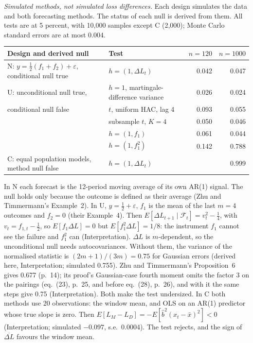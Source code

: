 \begin{qfmethod}
\emph{Simulated methods, not simulated loss differences.} Each design simulates the data and both forecasting methods. The status of each null is derived from them. All tests are at 5 percent, with 10,000 samples except C (2,000); Monte Carlo standard errors are at most 0.004.
\begin{center}\small
\begin{tabular}{@{}llrr@{}}
\toprule
Design and derived null & Test & $n=120$ & $n=1000$ \\
\midrule
N: $y=\tfrac12(f_1+f_2)+\varepsilon$, conditional null true & $h=(1,\Delta L_t)$ & 0.042 & 0.047 \\
U: unconditional null true, & $h=1$, martingale-difference variance & 0.026 & 0.024 \\
\quad conditional null false & $t$, uniform HAC, lag 4 & 0.093 & 0.055 \\
 & subsample $t$, $K=4$ & 0.050 & 0.046 \\
 & $h=(1,f_1)$ & 0.061 & 0.044 \\
 & $h=(1,f_1^2)$ & 0.142 & 0.788 \\
C: equal population models, method null false & $h=(1,\Delta L_t)$ & & 0.999 \\
\bottomrule
\end{tabular}
\end{center}
In N each forecast is the 12-period moving average of its own AR(1) signal. The null holds only because the outcome is defined as their average (Zhu and Timmermann's Example~2). In U, $y=\tfrac12+\varepsilon$, $f_1$ is the mean of the last $m=4$ outcomes and $f_2=0$ (their Example~4). Then $E[\Delta L_{t+1}\mid\mathcal F_t]=v_t^2-\tfrac14$, with $v_t=f_{1,t}-\tfrac12$, so $E[f_1\Delta L]=0$ but $E[f_1^2\Delta L]=1/8$: the instrument $f_1$ cannot see the failure and $f_1^2$ can (Interpretation). $\Delta L$ is $m$-dependent, so the unconditional null needs autocovariances. Without them, the variance of the normalised statistic is $(2m+1)/(3m)=0.75$ for Gaussian errors (derived here, Interpretation; simulated 0.755). Zhu and Timmermann's Proposition~6 gives 0.677 (p.~14); its proof's Gaussian-case fourth moment omits the factor 3 on the pairings (eq.~(23), p.~25, and before eq.~(28), p.~26), and with it the same steps give 0.75 (Interpretation). Both make the test undersized. In C both methods use 20 observations: the window mean, and OLS on an AR(1) predictor whose true slope is zero. Then $E[L_M-L_D]=-E[\hat b^2(x_t-\bar x)^2]<0$ (Interpretation; simulated $-0.097$, s.e.\ 0.0004). The test rejects, and the sign of $\overline{\Delta L}$ favours the window mean.


\end{qfmethod}
